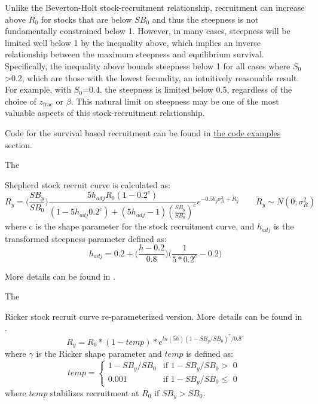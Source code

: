 Unlike the Beverton-Holt stock-recruitment relationship, recruitment can increase above $R_0$ for stocks that are below $SB_0$ and thus the steepness is not fundamentally constrained below 1. However, in many cases, steepness will be limited well below 1 by the inequality above, which implies an inverse relationship between the maximum steepness and equilibrium survival. Specifically, the inequality above bounds steepness below 1 for all cases where $S_0$>0.2, which are those with the lowest fecundity, an intuitively reasonable result. For example, with $S_0$=0.4, the steepness is limited below 0.5, regardless of the choice of $z_{\text{frac}}$ or $\beta$. This natural limit on steepness may be one of the most valuable aspects of this stock-recruitment relationship.

Code for the survival based recruitment can be found in \hyperlink{AppendixC}{the code examples} section.

\hypertarget{Shepherd}{The} Shepherd stock recruit curve is calculated as:
\begin{equation}
R_y = \bigg(\frac{SB_y}{SB_0}\bigg)\frac{5h_{adj}R_0(1-0.2^c)}{(1-5h_{adj}0.2^c)+(5h_{adj}-1)(\frac{SB_y}{SB_0})^c}e^{-0.5b_y\sigma^2_R+\tilde{R}_y}\qquad \tilde{R}_y\sim N(0;\sigma^2_R)
\end{equation}
where c is the shape parameter for the stock recruitment curve, and $h_{adj}$ is the transformed steepness parameter defined as:
\begin{equation}
h_{adj}=0.2+\bigg(\frac{h-0.2}{0.8}\bigg)\bigg(\frac{1}{5*0.2^c}-0.2\bigg)
\end{equation}

More details can be found in \citet{punt_extending_2019}.


\hypertarget{Ricker2}{The} Ricker stock recruit curve re-parameterized version. More details can be found in \citet{punt_extending_2019}.
\begin{equation}
R_y = R_0*(1-temp)*e^{ln(5h)(1-SB_y/SB_0)^{\gamma}/0.8^{\gamma}}
\end{equation}
where $\gamma$ is the Ricker shape parameter and $temp$ is defined as:
\begin{equation}
temp = 
\begin{cases}
1-SB_y/SB_0 & \text{if $1-SB_y/SB_0 >$ 0 }\\
0.001 & \text{if $1-SB_y/SB_0 \leq$ 0}
\end{cases}		
\end{equation}
where $temp$ stabilizes recruitment at $R_0$ if $SB_y > SB_0$. 


